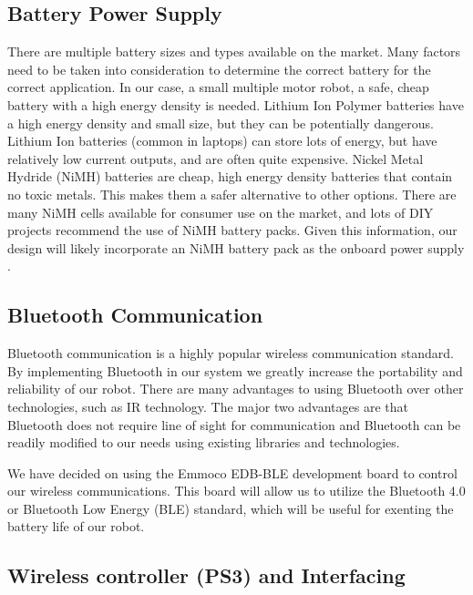 \documentclass[11pt]{report}
\begin{document}
\begin{spacing}{1.5}
\subsection*{Battery Power Supply}
There are multiple battery sizes and types available on the market. Many factors need to be taken into consideration to determine the correct battery for the correct application. In our case, a small multiple motor robot, a safe, cheap battery with a high energy density is needed. Lithium Ion Polymer batteries have a high energy density and small size, but they can be potentially dangerous. Lithium Ion batteries (common in laptops) can store lots of energy, but have relatively low current outputs, and are often quite expensive. Nickel Metal Hydride (NiMH) batteries are cheap, high energy density batteries that contain no toxic metals. This makes them a safer alternative to other options. There are many NiMH cells available for consumer use on the market, and lots of DIY projects recommend the use of NiMH battery packs. Given this information, our design will likely incorporate an NiMH battery pack as the onboard power supply \cite{Calin}.

\subsection*{Bluetooth Communication}
Bluetooth\textsuperscript{\textregistered} communication is a highly popular wireless communication standard.  By implementing Bluetooth\textsuperscript{\textregistered} in our system we greatly increase the portability and reliability of our robot.  There are many advantages to using Bluetooth\textsuperscript{\textregistered} over other technologies, such as IR technology.  The major two advantages are that Bluetooth\textsuperscript{\textregistered} does not require line of sight for communication and Bluetooth\textsuperscript{\textregistered} can be readily modified to our needs using existing libraries and technologies.

We have decided on using the Emmoco EDB-BLE development board to control our wireless communications.  This board will allow us to utilize the Bluetooth\textsuperscript{\textregistered} 4.0 or Bluetooth\textsuperscript{\textregistered} Low Energy (BLE) standard, which will be useful for exenting the battery life of our robot.

\subsection*{Wireless controller (PS3) and Interfacing}


\end{spacing}
\end{document}
